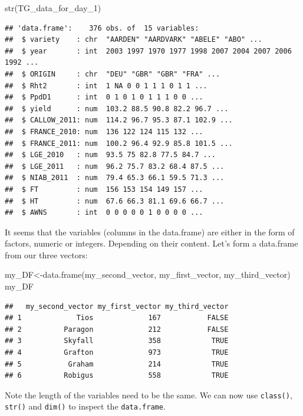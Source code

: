 \documentclass[
]{book}
\newenvironment{Shaded}{\begin{snugshade}}{\end{snugshade}}
\newcommand{\FunctionTok}[1]{\textcolor[rgb]{0.00,0.00,0.00}{#1}}
\newcommand{\NormalTok}[1]{#1}
\newcommand{\OtherTok}[1]{\textcolor[rgb]{0.56,0.35,0.01}{#1}}
\begin{document}
\begin{Shaded}
\begin{Highlighting}[]
\FunctionTok{str}\NormalTok{(TG\_data\_for\_day\_1)}
\end{Highlighting}
\end{Shaded}

\begin{verbatim}
## 'data.frame':    376 obs. of  15 variables:
##  $ variety    : chr  "AARDEN" "AARDVARK" "ABELE" "ABO" ...
##  $ year       : int  2003 1997 1970 1977 1998 2007 2004 2007 2006 1992 ...
##  $ ORIGIN     : chr  "DEU" "GBR" "GBR" "FRA" ...
##  $ Rht2       : int  1 NA 0 0 1 1 1 0 1 1 ...
##  $ PpdD1      : int  0 1 0 1 0 1 1 1 0 0 ...
##  $ yield      : num  103.2 88.5 90.8 82.2 96.7 ...
##  $ CALLOW_2011: num  114.2 96.7 95.3 87.1 102.9 ...
##  $ FRANCE_2010: num  136 122 124 115 132 ...
##  $ FRANCE_2011: num  100.2 96.4 92.9 85.8 101.5 ...
##  $ LGE_2010   : num  93.5 75 82.8 77.5 84.7 ...
##  $ LGE_2011   : num  96.2 75.7 83.2 68.4 87.5 ...
##  $ NIAB_2011  : num  79.4 65.3 66.1 59.5 71.3 ...
##  $ FT         : num  156 153 154 149 157 ...
##  $ HT         : num  67.6 66.3 81.1 69.6 66.7 ...
##  $ AWNS       : int  0 0 0 0 0 1 0 0 0 0 ...
\end{verbatim}

It seems that the variables (columns in the data.frame) are either in the form of factors, numeric or integers. Depending on their content. Let's form a data.frame from our three vectors:

\begin{Shaded}
\begin{Highlighting}[]
\NormalTok{my\_DF}\OtherTok{\textless{}{-}}\FunctionTok{data.frame}\NormalTok{(my\_second\_vector, my\_first\_vector, my\_third\_vector)}
\NormalTok{my\_DF}
\end{Highlighting}
\end{Shaded}

\begin{verbatim}
##   my_second_vector my_first_vector my_third_vector
## 1             Tios             167           FALSE
## 2          Paragon             212           FALSE
## 3          Skyfall             358            TRUE
## 4          Grafton             973            TRUE
## 5           Graham             214            TRUE
## 6          Robigus             558            TRUE
\end{verbatim}

Note the length of the variables need to be the same. We can now use \texttt{class()}, \texttt{str()} and \texttt{dim()} to inspect the \texttt{data.frame}.
\end{document}
